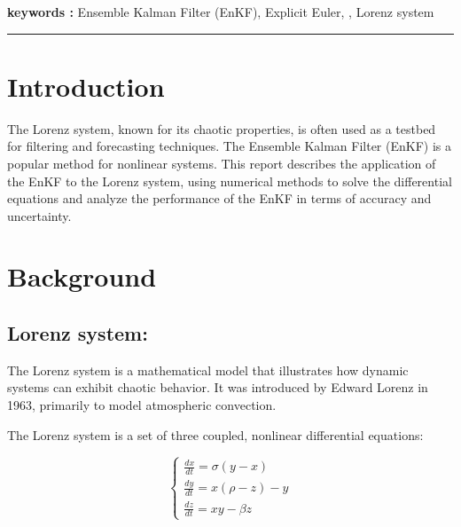 \documentclass[a4paper,12pt,french]{article}
\begin{document}
{\noindent\textbf{keywords :}}
Ensemble Kalman Filter (EnKF), Explicit Euler, , Lorenz system
\\
\noindent\rule[2pt]{\textwidth}{0.5pt}

\vspace*{\fill}
\newpage


\thispagestyle{empty}
\tableofcontents

\newpage
\section{Introduction}
The Lorenz system, known for its chaotic properties, 
is often used as a testbed for filtering and forecasting techniques. 
The Ensemble Kalman Filter (EnKF) is a popular method for nonlinear systems.
 This report describes the application of the EnKF to the Lorenz system, 
 using numerical methods to solve the differential equations 
 and analyze the performance of the EnKF in terms of accuracy and uncertainty.



\newpage
\section{Background}
\subsection{Lorenz system:}

The Lorenz system \cite{lorenz} is a mathematical model that illustrates how dynamic systems can exhibit chaotic behavior.
 It was introduced by Edward Lorenz in 1963,
  primarily to model atmospheric convection.

The Lorenz system is a set of three coupled, 
nonlinear differential equations:

\begin{equation}
    \begin{cases}
        \displaystyle\frac{dx}{dt} = \sigma(y - x) \\
        \displaystyle\frac{dy}{dt} = x(\rho - z) - y \\
        \displaystyle\frac{dz}{dt} = xy - \beta z
    \end{cases}
\end{equation}
\end{document}
